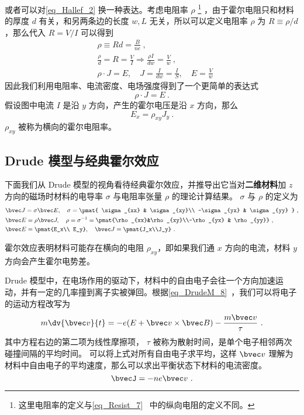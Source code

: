 或者可以对\autoref{eq_Hallef_2} 换一种表达。考虑电阻率 $\rho$
\footnote{这里电阻率的定义与\autoref{eq_Resist_7}~ 中的纵向电阻的定义不同。} ，由于霍尔电阻只和材料的厚度 $d$ 有关，和另两条边的长度 $w,L$ 无关，所以可以定义电阻率 $\rho$ 为 $R\equiv\rho /d$，那么代入 $R=V/I$ 可以得到
\begin{equation}
\begin{aligned}
&\rho\equiv Rd=\frac{B}{ne}~,\\
&\frac{\rho }{d} =R= \frac{V}{I}\Rightarrow \frac{\rho I}{dw}=\frac{V}{w}~,\\
&\rho \cdot J = E,\quad J= \frac{I}{dw}=\frac{I}{S},\quad E=\frac{V}{w}
\end{aligned}
\end{equation}
因此我们利用电阻率、电流密度、电场强度得到了一个更简单的表达式
\begin{equation}
\rho\cdot J=E~.
\end{equation}
假设图中电流 $I$ 是沿 $y$ 方向，产生的霍尔电压是沿 $x$ 方向，那么
\begin{equation}
E_x = \rho_{xy} J_y~.
\end{equation}
$\rho_{xy}$ 被称为横向的霍尔电阻率。

\subsection{Drude 模型与经典霍尔效应}
下面我们从 Drude 模型的视角看待经典霍尔效应，并推导出它当对\textbf{二维材料}加 $z$ 方向的磁场时材料的电导率 $\sigma$ 与电阻率张量 $\rho$ 的理论计算结果。 $\sigma$ 与 $\rho$ 的定义为
\begin{equation}
\begin{aligned}
&\bvec J=\sigma \bvec E,\quad \sigma=\pmat{
    \sigma_{xx} & \sigma_{xy}\\
    -\sigma_{yx} & \sigma_{yy}
}
~,\\
&\bvec E=\rho \bvec J,\quad \rho = \sigma^{-1} =
\pmat{\rho_{xx}&\rho_{xy}\\-\rho_{yx} & \rho_{yy}}~,\\
&\bvec E=\pmat{E_x\\ E_y},\quad \bvec J = \pmat{J_x\\J_y}~.
\end{aligned}
\end{equation}

霍尔效应表明材料可能存在横向的电阻 $\rho_{xy}$，即如果我们通 $x$ 方向的电流，材料 $y$ 方向会产生霍尔电势差。

Drude 模型中，在电场作用的驱动下，材料中的自由电子会往一个方向加速运动，并有一定的几率撞到离子实被弹回。根据\autoref{eq_DrudeM_8}~，我们可以将电子的运动方程改写为
\begin{equation}
m\dv{\bvec v}{t} =  -e(E+\bvec v\times \bvec B)-\frac{m\bvec v}{\tau} ~.
\end{equation}
其中方程右边的第二项为线性摩擦项， $\tau$ 被称为散射时间，是单个电子相邻两次碰撞间隔的平均时间。
可以将上式对所有自由电子求平均，这样 $\bvec v$ 理解为材料中自由电子的平均速度，那么可以求出平衡状态下材料的电流密度。
\begin{equation}
\bvecJ=-ne\bvec v~.
\end{equation}


